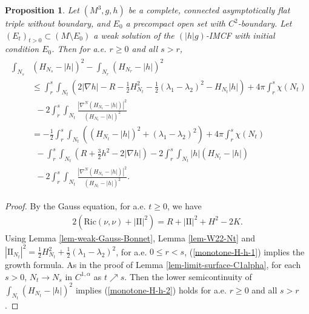 \documentclass[11pt, letterpaper]{amsart}
\newtheorem{prop}[thm]{Proposition}
\theoremstyle{definition}
\theoremstyle{remark}
\begin{document}
\begin{prop}\label{prop-growth-a.e.}
	Let $(M^3, g, h)$ be a complete, connected asymptotically flat triple without boundary, and $E_0$ a precompact open set with $C^2$-boundary. Let $(E_t)_{t>0} \subset (M \setminus E_0)$ a weak solution of the $(|h|g)$-IMCF with initial condition $E_0$. Then for a.e. $r \geq 0$ and all $s> r$,
	\begin{align}\label{monotone-H-h-2}
	\begin{split}
		\int_{N_s}  &(H_{N_s} - |h| )^2  - \int_{{N}_r}  (H_{{N}_r} - |h| )^2 \\
					       &\leq  \int_{r}^{s} \int_{N_t} \left( 2|\nabla h| -R -\frac{1}{2} H^2_{N_t}- \frac{1}{2}(\lambda _1 - \lambda _2)^2 -H_{N_t} |h| \right) + 4 \pi  \int_{r}^{s} \chi (N_t) \\
					       &\ \ - 2 \int_{r}^{s} \int_{{N}_t}   \frac{|{\nabla }^{N} (H_{{N}_t} -|h|)|^2}{(H_{{N}_t} - |h|)^2} \\
					       &= -\frac{1}{2} \int_{r}^{s} \int_{N_t} \left(  (H_{N_t}-|h|)^2 + (\lambda _1-\lambda _2)^2 \right) + 4 \pi \int_{r}^{s} \chi (N_t)\\
					       &\ \ - \int_{r}^{s} \int_{N_t} \left( R + \frac{3}{2} h ^2 - 2|\nabla h| \right) - 2 \int_{r}^{s} \int_{N_t} |h| (H_{N_t}- |h|)  \\
					       &\ \ - 2 \int_{r}^{s} \int_{{N}_t}   \frac{|{\nabla }^{N} (H_{{N}_t} -|h|)|^2}{(H_{{N}_t} - |h|)^2} .
	\end{split}
\end{align}
\end{prop} 
\begin{proof}
By the Gauss equation, for a.e. $t \geq 0$, we have
\begin{align*}
	2(\mathrm{Ric}(\nu ,\nu ) + |\mathrm{II}|^2) = R + |\mathrm{II}|^2+ H^2 - 2K .
\end{align*} 
Using Lemma \ref{lem-weak-Gauss-Bonnet}, Lemma \ref{lem-W22-Nt} and $|\mathrm{II}_{N_t}|^2 = \frac{1}{2}H_{N_t}^2+ \frac{1}{2}(\lambda _1 - \lambda _2)^2$, for a.e. $0\leq r<s$, (\ref{monotone-H-h-1}) implies the growth formula. As in the proof of Lemma \ref{lem-limit-surface-C1alpha}, for each $s>0$, $N_{t} \to N_{s}$ in $C^{1, \alpha }$ as $t \nearrow s$. Then the lower semicontinuity of $\int_{N_t}(H_{N_t}-|h|)^2$ implies (\ref{monotone-H-h-2}) holds for a.e. $r \geq 0$ and all $s>r$.  
\end{proof}
\end{document}

